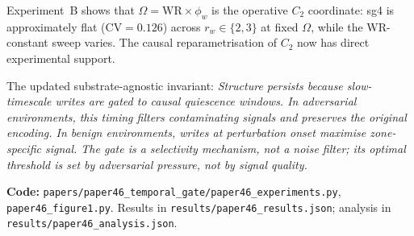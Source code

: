 \documentclass[11pt,a4paper]{article}
\begin{document}
Experiment~B shows that $\Omega = \mathrm{WR}\times\phi_w$ is the operative
$C_2$ coordinate: sg4 is approximately flat (CV$=0.126$) across $r_w\in\{2,3\}$
at fixed $\Omega$, while the WR-constant sweep varies.
The causal reparametrisation of $C_2$ now has direct experimental support.

The updated substrate-agnostic invariant:
\emph{Structure persists because slow-timescale writes are gated to causal
quiescence windows.
In adversarial environments, this timing filters contaminating signals and
preserves the original encoding.
In benign environments, writes at perturbation onset maximise zone-specific signal.
The gate is a selectivity mechanism, not a noise filter;
its optimal threshold is set by adversarial pressure, not by signal quality.}

\bigskip
\noindent\textbf{Code:}
\texttt{papers/paper46\_temporal\_gate/paper46\_experiments.py},
\texttt{paper46\_figure1.py}.
Results in \texttt{results/paper46\_results.json};
analysis in \texttt{results/paper46\_analysis.json}.
\end{document}
